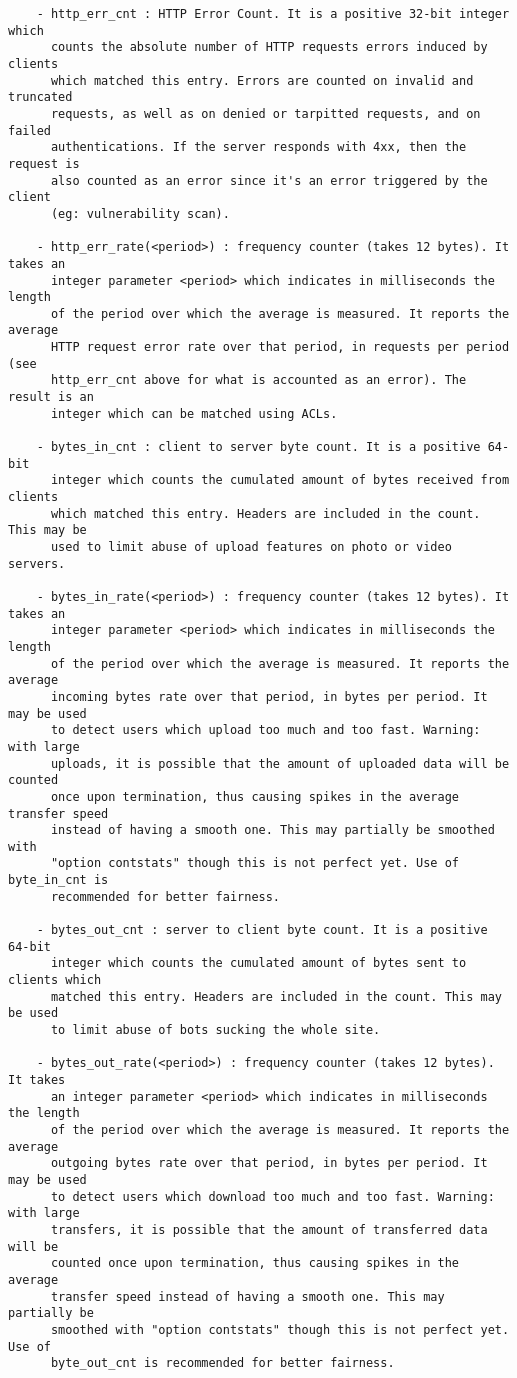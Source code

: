 \begin{verbatim}
    - http_err_cnt : HTTP Error Count. It is a positive 32-bit integer which
      counts the absolute number of HTTP requests errors induced by clients
      which matched this entry. Errors are counted on invalid and truncated
      requests, as well as on denied or tarpitted requests, and on failed
      authentications. If the server responds with 4xx, then the request is
      also counted as an error since it's an error triggered by the client
      (eg: vulnerability scan).

    - http_err_rate(<period>) : frequency counter (takes 12 bytes). It takes an
      integer parameter <period> which indicates in milliseconds the length
      of the period over which the average is measured. It reports the average
      HTTP request error rate over that period, in requests per period (see
      http_err_cnt above for what is accounted as an error). The result is an
      integer which can be matched using ACLs.

    - bytes_in_cnt : client to server byte count. It is a positive 64-bit
      integer which counts the cumulated amount of bytes received from clients
      which matched this entry. Headers are included in the count. This may be
      used to limit abuse of upload features on photo or video servers.

    - bytes_in_rate(<period>) : frequency counter (takes 12 bytes). It takes an
      integer parameter <period> which indicates in milliseconds the length
      of the period over which the average is measured. It reports the average
      incoming bytes rate over that period, in bytes per period. It may be used
      to detect users which upload too much and too fast. Warning: with large
      uploads, it is possible that the amount of uploaded data will be counted
      once upon termination, thus causing spikes in the average transfer speed
      instead of having a smooth one. This may partially be smoothed with
      "option contstats" though this is not perfect yet. Use of byte_in_cnt is
      recommended for better fairness.

    - bytes_out_cnt : server to client byte count. It is a positive 64-bit
      integer which counts the cumulated amount of bytes sent to clients which
      matched this entry. Headers are included in the count. This may be used
      to limit abuse of bots sucking the whole site.

    - bytes_out_rate(<period>) : frequency counter (takes 12 bytes). It takes
      an integer parameter <period> which indicates in milliseconds the length
      of the period over which the average is measured. It reports the average
      outgoing bytes rate over that period, in bytes per period. It may be used
      to detect users which download too much and too fast. Warning: with large
      transfers, it is possible that the amount of transferred data will be
      counted once upon termination, thus causing spikes in the average
      transfer speed instead of having a smooth one. This may partially be
      smoothed with "option contstats" though this is not perfect yet. Use of
      byte_out_cnt is recommended for better fairness.


\end{verbatim}
